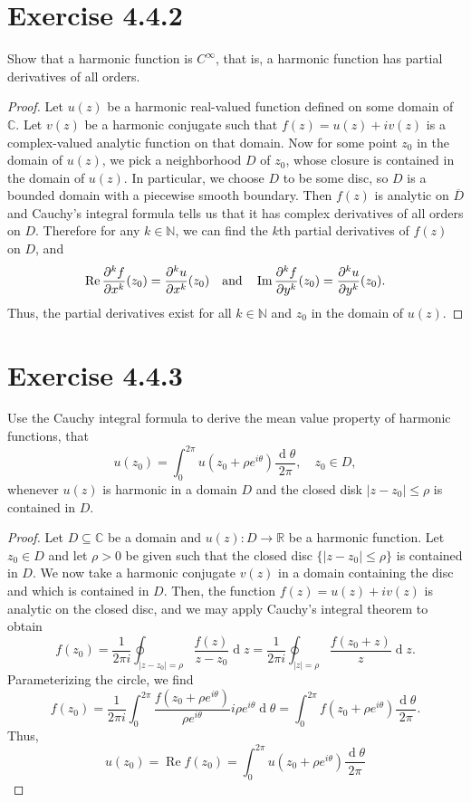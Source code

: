 \documentclass[12pt]{article}
\newenvironment{problem}
    {\begin{lrbox}{\mybox}\begin{minipage}{0.98\textwidth}}
    {\end{minipage}\end{lrbox}\framebox[\textwidth]{\usebox{\mybox}}}
\newcommand{\isp}[1]{\quad\text{#1}\quad}
\newcommand{\N}{\mathbb{N}} %
\newcommand{\R}{\mathbb{R}} %
\newcommand{\C}{\mathbb{C}} %
\newcommand{\<}{\left\langle} %
\renewcommand{\>}{\right\rangle} %
\renewcommand{\Im}{\operatorname{Im}} %
\renewcommand{\Re}{\operatorname{Re}} %
\renewcommand{\d}[1]{\operatorname{d}\!#1} %
\newcommand{\pd}[3][1]{\ifx1#1{\frac{\partial #2}{\partial#3}}\else{\frac{\partial^{#1}#2}{\partial#3^{#1}}}\fi} %
\let\clo\overline %
\begin{document}
\newpage
\section{Exercise 4.4.2}
\begin{problem}
    Show that a harmonic function is $C^\infty$, that is, a harmonic function has partial derivatives of all orders.
\end{problem}

\begin{proof}
    Let $u(z)$ be a harmonic real-valued function defined on some domain of $\C$. Let $v(z)$ be a harmonic conjugate such that $f(z) = u(z) + iv(z)$ is a complex-valued analytic function on that domain. Now for some point $z_0$ in the domain of $u(z)$, we pick a neighborhood $D$ of $z_0$, whose closure is contained in the domain of $u(z)$. In particular, we choose $D$ to be some disc, so $D$ is a bounded domain with a piecewise smooth boundary. Then $f(z)$ is analytic on $\clo{D}$ and Cauchy's integral formula tells us that it has complex derivatives of all orders on $D$. Therefore for any $k \in \N$, we can find the $k$th partial derivatives of $f(z)$ on $D$, and
    \[
        \Re \pd[k]{f}{x}(z_0) = \pd[k]{u}{x}(z_0)  \isp{and}  \Im \pd[k]{f}{y}(z_0) = \pd[k]{u}{y}(z_0).
    \]
    Thus, the partial derivatives exist for all $k \in \N$ and $z_0$ in the domain of $u(z)$.
    
\end{proof}

\newpage
\section{Exercise 4.4.3}
\begin{problem}
    Use the Cauchy integral formula to derive the mean value property of harmonic functions, that
    \[u(z_0) = \int_0^{2\pi} u \left( z_0 + \rho e^{i\theta} \right) \frac{\d{\theta}}{2\pi}, \quad z_0 \in D,\]
    whenever $u(z)$ is harmonic in a domain $D$ and the closed disk $|z - z_0| \leq \rho$ is contained in $D$.
\end{problem}

\begin{proof}
    Let $D \subseteq \C$ be a domain and $u(z) : D \to \R$ be a harmonic function. Let $z_0 \in D$ and let $\rho > 0$ be given such that the closed disc $\{|z - z_0| \leq \rho\}$ is contained in $D$. We now take a harmonic conjugate $v(z)$ in a domain containing the disc and which is contained in $D$. Then, the function $f(z) = u(z) + iv(z)$ is analytic on the closed disc, and we may apply Cauchy's integral theorem to obtain
    \[
        f(z_0) = \frac{1}{2 \pi i} \oint_{|z - z_0| = \rho} \frac{f(z)}{z - z_0} \d{z} = \frac{1}{2 \pi i} \oint_{|z| = \rho} \frac{f(z_0 + z)}{z} \d{z}.
    \]
    Parameterizing the circle, we find
    \[
        f(z_0) = \frac{1}{2 \pi i} \int_0^{2\pi} \frac{f(z_0 + \rho e^{i \theta})}{\rho e^{i \theta}} i \rho e^{i\theta} \d{\theta} = \int_0^{2\pi} f(z_0 + \rho e^{i \theta}) \frac{\d{\theta}}{2\pi}.
    \]
    Thus,
    \[
        u(z_0) = \Re f(z_0) = \int_0^{2\pi} u(z_0 + \rho e^{i \theta}) \frac{\d{\theta}}{2\pi}
    \]
    
\end{proof}
\end{document}
